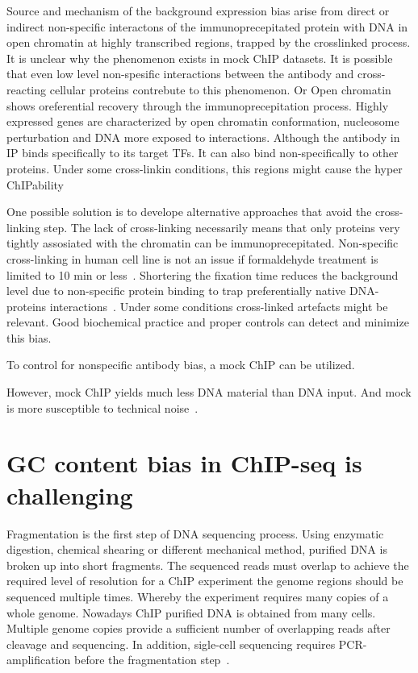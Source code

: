 Source and mechanism of the background expression bias arise from direct or indirect non-specific interactons of the immunoprecepitated protein with DNA in  open chromatin at highly transcribed regions, trapped by the crosslinked process.
It is unclear why the phenomenon exists in mock ChIP datasets.
It is possible that even low level non-spesific interactions between the antibody and cross-reacting cellular proteins contrebute to this phenomenon.
Or Open chromatin shows oreferential recovery through the immunoprecepitation process.
Highly expressed genes are characterized by open chromatin conformation, nucleosome perturbation and DNA more exposed to interactions.\cite{}
Although the antibody in IP binds specifically to its target TFs.
It can also bind non-specifically to other proteins.
Under some cross-linkin conditions, this regions might cause the hyper ChIPability\cite{}

One possible solution is to develope alternative approaches that avoid the cross-linking step.
The lack of cross-linking necessarily means that only proteins very tightly assosiated with the chromatin can be immunoprecepitated.
Non-specific cross-linking in human cell line is not an issue if formaldehyde treatment is limited to 10 min or less~\cite{}.
Shortering the fixation time reduces the background level due to non-specific protein binding to trap preferentially native DNA-proteins interactions~\cite{baranello2016chip}.
Under some conditions cross-linked artefacts might be relevant.
Good biochemical practice and proper controls can detect and minimize this bias.

To control for nonspecific antibody bias, a mock ChIP can be utilized.

However, mock ChIP yields much less DNA material than DNA input.
And mock is more susceptible to technical noise~\cite{kidder2011chip, landt2012chip}.

\section{GC content bias in ChIP-seq is challenging}

Fragmentation is the first step of DNA sequencing process.
Using enzymatic digestion, chemical shearing or different mechanical method, purified DNA is broken up into short fragments.
The sequenced reads must overlap to achieve the required level of resolution for a ChIP experiment the genome regions should be sequenced multiple times.
Whereby the experiment requires many copies of a whole genome.
Nowadays ChIP purified DNA is obtained from many cells.
Multiple genome copies provide a sufficient number of overlapping reads after cleavage and sequencing.
In addition, sigle-cell sequencing requires PCR-amplification before the fragmentation step~\cite{clark2016single}.

